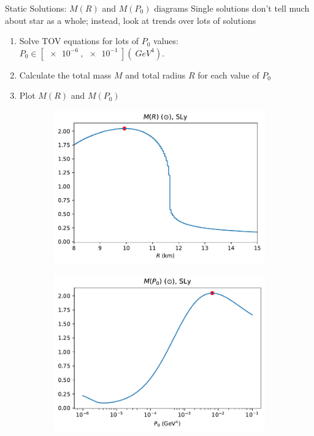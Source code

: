 \documentclass[]{beamer}
\begin{document}
    \begin{frame}{Static Solutions: $M(R)$ and $M(P_0)$ diagrams}
        \pause
        Single solutions don't tell much about star as a whole; instead, look at trends over lots of solutions \pause
        \begin{enumerate}
            \item Solve TOV equations for lots of $P_0$ values: \pause $P_0 \in [\SI{e-6}{}, \SI{e-1}{}](\SI{}{GeV^4}).$\pause
            \item Calculate the total mass $M$ and total radius $R$ for each value of $P_0$ \pause
            \item Plot $M(R)$ and $M(P_0)$\pause
        \end{enumerate}

        \begin{figure}[h!]
            \centering
            \begin{subfigure}{.5\textwidth}
                \includegraphics[width = \textwidth]{r_analysis,SLy.pdf}
            \end{subfigure}%
            \begin{subfigure}{.5\textwidth}
                \includegraphics[width = \textwidth]{p0_analysis,SLy.pdf}

\end{subfigure}
\end{figure}
\end{frame}
\end{document}
